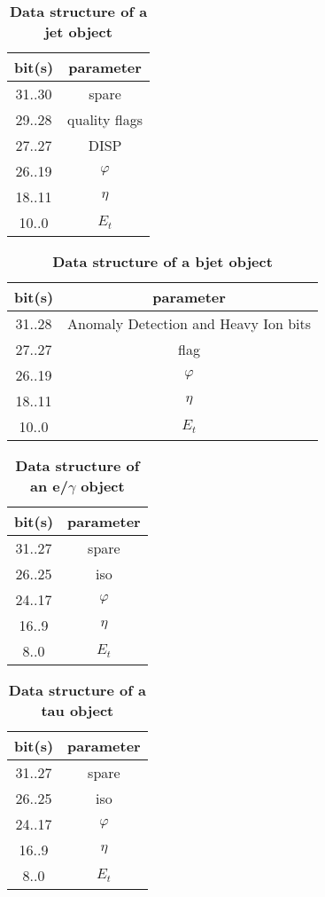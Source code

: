\documentclass{cmspaper}
\begin{document}
\begin{table}[ht]
\caption{\bf Data structure of a jet object}
\vspace{5mm}
\centering
\begin{tabular}{|c|c|}\hline
bit(s) & parameter \\\hline\hline
31..30 & spare \\
29..28 & quality flags \\
27..27 & DISP \\
26..19 & $\varphi$ \\
18..11 & $\eta$ \\
10..0 & $E_t$ \\\hline
\end{tabular}
\label{table:jet_object}
\end{table}

\begin{table}[ht]
\caption{\bf Data structure of a bjet object}
\vspace{5mm}
\centering
\begin{tabular}{|c|c|}\hline
bit(s) & parameter \\\hline\hline
31..28 & Anomaly Detection and Heavy Ion bits \\
27..27 & flag \\
26..19 & $\varphi$ \\
18..11 & $\eta$ \\
10..0 & $E_t$ \\\hline
\end{tabular}
\label{table:bjet_object}
\end{table}

\begin{table}[ht]
\caption{\bf Data structure of an e/$\gamma$ object}
\vspace{5mm}
\centering
\begin{tabular}{|c|c|}\hline
bit(s) & parameter \\\hline\hline
31..27 & spare \\
26..25 & iso \\
24..17 & $\varphi$ \\
16..9 & $\eta$ \\
8..0 & $E_t$ \\\hline
\end{tabular}
\label{table:egamma_object}
\end{table}

\begin{table}[ht]
\caption{\bf Data structure of a tau object}
\vspace{5mm}
\centering
\begin{tabular}{|c|c|}\hline
bit(s) & parameter \\\hline\hline
31..27 & spare \\
26..25 & iso \\
24..17 & $\varphi$ \\
16..9 & $\eta$ \\
8..0 & $E_t$ \\\hline
\end{tabular}
\label{table:tau_object}
\end{table}
\end{document}
